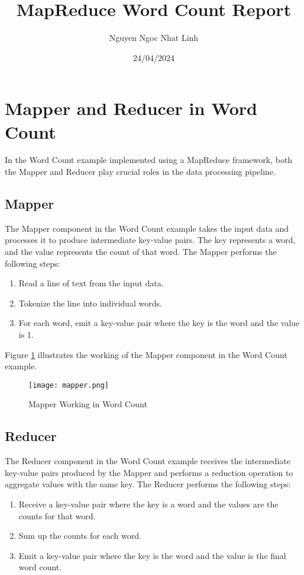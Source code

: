 \documentclass{article}
\title{MapReduce Word Count Report}
\author{Nguyen Ngoc Nhat Linh}
\date{24/04/2024}
\begin{document}
\maketitle

\section{Mapper and Reducer in Word Count}

In the Word Count example implemented using a MapReduce framework, both the Mapper and Reducer play crucial roles in the data processing pipeline.

\subsection{Mapper}

The Mapper component in the Word Count example takes the input data and processes it to produce intermediate key-value pairs. The key represents a word, and the value represents the count of that word. The Mapper performs the following steps:

\begin{enumerate}
  \item Read a line of text from the input data.
  \item Tokenize the line into individual words.
  \item For each word, emit a key-value pair where the key is the word and the value is 1.
\end{enumerate}

Figure \ref{fig:mapper} illustrates the working of the Mapper component in the Word Count example.

\begin{figure}[h]
  \centering
  \texttt{[image: mapper.png]}
  \caption{Mapper Working in Word Count}
  \label{fig:mapper}
\end{figure}

\subsection{Reducer}

The Reducer component in the Word Count example receives the intermediate key-value pairs produced by the Mapper and performs a reduction operation to aggregate values with the same key. The Reducer performs the following steps:

\begin{enumerate}
  \item Receive a key-value pair where the key is a word and the values are the counts for that word.
  \item Sum up the counts for each word.
  \item Emit a key-value pair where the key is the word and the value is the final word count.
\end{enumerate}
\end{document}
